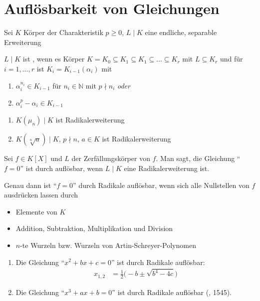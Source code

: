 \section{Auflösbarkeit von Gleichungen} \label{sec:2_8}

Sei $K$ Körper der Charakteristik $p\ge 0$, $L\mid K$ eine endliche, separable Erweiterung

\begin{definition}
	$L\mid K$ ist , wenn es Körper $K = K_0 \subseteq K_1 \subseteq K_1 \subseteq \dots \subseteq K_r$ mit $L\subseteq K_r$ und für $i=1,\dots,r$ ist $K_i = K_{i-1}(\alpha_i)$ mit \begin{enumerate}[label={(\roman*)}]
		\item $\alpha_i^{n_i}\in K_{i-1}$ für $n_i\in\mathbb N$ mit $p\nmid n_i$ \emph{oder}
		\item $\alpha_i^p - \alpha_i\in K_{i-1}$
	\end{enumerate}
\end{definition}

\begin{example}
	\begin{enumerate}[label={\alph*)}]
		\item $K(\mu_n)\mid K$ ist Radikalerweiterung
		\item $K(\sqrt[n]a)\mid K$, $p\nmid n$, $a\in K$ ist Radikalerweiterung
	\end{enumerate}
\end{example}

\begin{definition}
	Sei $f\in K[X]$ und $L$ der Zerfällungskörper von $f$. Man sagt, die Gleichung "`$f=0$"' ist durch  auflösbar, wenn $L\mid K$ eine Radikalerweiterung ist.
\end{definition}

\begin{remark}
	Genau dann ist "`$f=0$"' durch Radikale auflösbar, wenn sich alle Nullstellen von $f$ ausdrücken lassen durch \begin{itemize}
		\item Elemente von $K$
		\item Addition, Subtraktion, Multiplikation und Division
		\item $n$-te Wurzeln bzw. Wurzeln von Artin-Schreyer-Polynomen
	\end{itemize}
\end{remark}

\begin{example}
	\begin{enumerate}[label={\alph*)}]
		\item Die Gleichung "`$x^2 + bx + c = 0$"' ist durch Radikale auflösbar: \begin{align*}
			x_{1,2} &= \frac12 \big(- b \pm \sqrt{b^4-4c}\big)
		\end{align*}
		\item Die Gleichung "`$x^3 + ax + b=0$"' ist durch Radikale auflösbar (, 1545).
	\end{enumerate}
\end{example}

